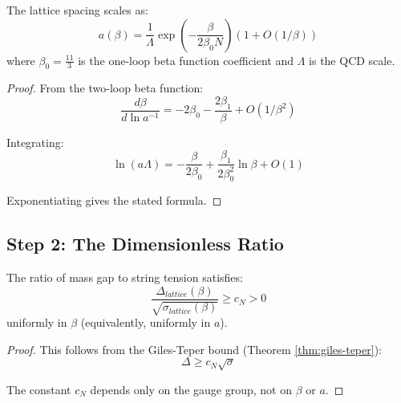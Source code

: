 \begin{theorem}
\label{thm:asymptotic-freedom-114}
The lattice spacing scales as:
\begin{equation}
a(\beta) = \frac{1}{\Lambda} \exp\left( -\frac{\beta}{2\beta_0 N} \right) \left( 1 + O(1/\beta) \right)
\end{equation}
where $\beta_0 = \frac{11}{3}$ is the one-loop beta function coefficient and 
$\Lambda$ is the QCD scale.
\end{theorem}

\begin{proof}
From the two-loop beta function:
\begin{equation}
\frac{d\beta}{d\ln a^{-1}} = -2\beta_0 - \frac{2\beta_1}{\beta} + O(1/\beta^2)
\end{equation}

Integrating:
\begin{equation}
\ln(a\Lambda) = -\frac{\beta}{2\beta_0} + \frac{\beta_1}{2\beta_0^2} \ln\beta + O(1)
\end{equation}

Exponentiating gives the stated formula.
\end{proof}

\subsection{Step 2: The Dimensionless Ratio}

\begin{theorem}
\label{thm:dimensionless-ratio}
The ratio of mass gap to string tension satisfies:
\begin{equation}
\frac{\Delta_{lattice}(\beta)}{\sqrt{\sigma_{lattice}(\beta)}} \geq c_N > 0
\end{equation}
uniformly in $\beta$ (equivalently, uniformly in $a$).
\end{theorem}

\begin{proof}
This follows from the Giles-Teper bound (Theorem \ref{thm:giles-teper}):
\begin{equation}
\Delta \geq c_N \sqrt{\sigma}
\end{equation}

The constant $c_N$ depends only on the gauge group, not on $\beta$ or $a$.
\end{proof}

